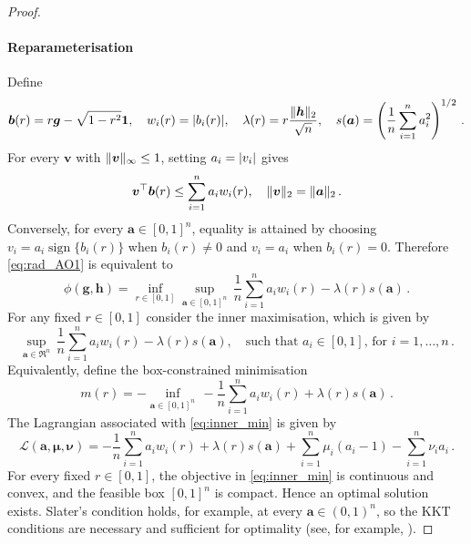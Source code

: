 \documentclass{article}
\makeatletter
\DeclareMathOperator{\sign}{sign}
\theoremstyle{definition}
\newcommand{\vnorm}[1]{%
	\ensuremath{%
		\if@display
		\left\| #1 \right\|
		\else
		\| #1 \|
		\fi
	}%
}
\newcommand{\abs}[1]{%
	\ensuremath{%
		\if@display
		\left| #1 \right|
		\else
		\lvert #1 \rvert
		\fi
	}%
}
\newcommand*{\bb}{\boldsymbol}
\def\bv{\bb{v}}
\makeatother
\begin{document}
\begin{bibunit}
\begin{proof}
	\paragraph*{Reparameterisation}
	Define
	$$
	\bb b(r)=r\bb g-\sqrt{1-r^2}\bb1,
	\quad
	w_i(r)=\abs{b_i(r)},
	\quad
	\lambda(r)=r\frac{\vnorm{\bb h}_2}{\sqrt n},
	\quad
	s(\bb a)=\left(\frac1n\sum_{i=1}^na_i^2\right)^{1/2}\,.
	$$
	For every $\bv$ with $\vnorm{\bv}_\infty\leq1$, setting
	$a_i=\abs{v_i}$ gives
	$$
	\bv^\top\bb b(r)
	\leq
	\sum_{i=1}^na_iw_i(r),
	\quad
	\vnorm{\bv}_2=\vnorm{\bb a}_2 \,. 
	$$
	Conversely, for every $\bb a\in[0,1]^n$, equality is attained by
	choosing $v_i=a_i\sign\{b_i(r)\}$ when $b_i(r)\neq0$ and
	$v_i=a_i$ when $b_i(r)=0$. Therefore \eqref{eq:rad_AO1} is
	equivalent to
	$$
	\phi(\bb g,\bb h)
	=
	\underset{r\in[0,1]}{\inf}
	\underset{\bb a\in[0,1]^n}{\sup} \, 
	\frac1n\sum_{i=1}^na_iw_i(r)-\lambda(r)s(\bb a)
    \,. 
	$$
	For any fixed $r \in [0,1]$ consider the inner maximisation, which is given by
	$$
		\underset{\bb a \in \Re^n}{\sup} \, \frac{1}{n} \sum_{i = 1}^{n} a_i w_i(r) - \lambda(r) s(\bb a), \quad \text{such that } a_i \in [0,1], \, \text{for } i = 1,\ldots,n \,.
	$$
	Equivalently, define the box-constrained minimisation
	\begin{equation}
		\label{eq:inner_min}
		m(r)
		=
		-\underset{\bb a \in [0,1]^n}{\inf}\, 
		-\frac1n\sum_{i=1}^na_iw_i(r)
		+\lambda(r)s(\bb a)
		\,. 
	\end{equation}
	The Lagrangian associated with \eqref{eq:inner_min} is given by
	$$
		\mathcal{L}(\bb a, \bb \mu, \bb \nu) = -\frac{1}{n} \sum_{i = 1}^{n} a_i w_i(r) + \lambda(r) s(\bb a) + \sum_{i = 1}^{n} \mu_i (a_i - 1) - \sum_{i =1}^{n} \nu_i a_i \,.
	$$
	For every fixed $r\in[0,1]$, the objective in \eqref{eq:inner_min}
	is continuous and convex, and the feasible box $[0,1]^n$ is compact.
	Hence an optimal solution exists. Slater's condition holds, for example,
	at every $\bb a\in(0,1)^n$, so the KKT conditions are necessary and
	sufficient for optimality (see, for example,
	\citealt[][Theorem~3.78]{beck:2017}).

\end{proof}
\end{bibunit}
\end{document}
